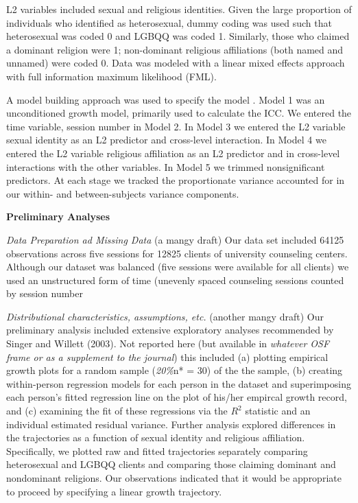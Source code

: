 \documentclass[
  english,
]{book}
\begin{document}
L2 variables included sexual and religious identities. Given the large proportion of individuals who identified as heterosexual, dummy coding was used such that heterosexual was coded 0 and LGBQQ was coded 1. Similarly, those who claimed a dominant religion were 1; non-dominant religious affiliations (both named and unnamed) were coded 0. Data was modeled with a linear mixed effects approach with full information maximum likelihood (FML).

A model building approach was used to specify the model \citep{hancock_hierarchical_2010, singer_applied_2003}. Model 1 was an unconditioned growth model, primarily used to calculate the ICC. We entered the time variable, session number in Model 2. In Model 3 we entered the L2 variable sexual identity as an L2 predictor and cross-level interaction. In Model 4 we entered the L2 variable religious affiliation as an L2 predictor and in cross-level interactions with the other variables. In Model 5 we trimmed nonsignificant predictors. At each stage we tracked the proportionate variance accounted for in our within- and between-subjects variance components.

\textbf{Preliminary Analyses}

\emph{Data Preparation ad Missing Data} (a mangy draft) Our data set included 64125 observations across five sessions for 12825 clients of university counseling centers. Although our dataset was balanced (five sessions were available for all clients) we used an unstructured form of time (unevenly spaced counseling sessions counted by session number

\emph{Distributional characteristics, assumptions, etc.} (another mangy draft) Our preliminary analysis included extensive exploratory analyses recommended by Singer and Willett (2003). Not reported here (but available in \emph{whatever OSF frame or as a supplement to the journal}) this included (a) plotting empirical growth plots for a random sample (\emph{20\%}n* = 30) of the the sample, (b) creating within-person regression models for each person in the dataset and superimposing each person's fitted regression line on the plot of his/her empircal growth record, and (c) examining the fit of these regressions via the \(R^2\) statistic and an individual estimated residual variance. Further analysis explored differences in the trajectories as a function of sexual identity and religious affiliation. Specifically, we plotted raw and fitted trajectories separately comparing heterosexual and LGBQQ clients and comparing those claiming dominant and nondominant religions. Our observations indicated that it would be appropriate to proceed by specifying a linear growth trajectory.
\end{document}
